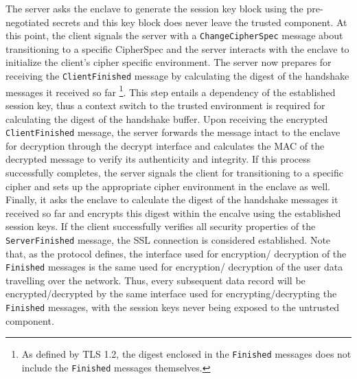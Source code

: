 \documentclass[../../main.tex]{subfiles}
\begin{document}
The server asks the enclave to generate the session key block using
the pre-negotiated secrets and this key block does never leave the
trusted component. At this point, the client signals the server with a
\texttt{ChangeCipherSpec} message about transitioning to a specific
CipherSpec and the server interacts with the enclave to initialize the
client's cipher specific environment. The server now prepares for
receiving the \texttt{ClientFinished} message by calculating the
digest of the handshake messages it received so far \footnote{As
  defined by TLS 1.2, the digest enclosed in the \texttt{Finished}
  messages does not include the \texttt{Finished} messages
  themselves.}. This step entails a dependency of the established
session key, thus a context switch to the trusted environment is
required for calculating the digest of the handshake buffer. Upon
receiving the encrypted \texttt{ClientFinished} message, the server
forwards the message intact to the enclave for decryption through the
decrypt interface and calculates the MAC of the decrypted message to
verify its authenticity and integrity. If this process successfully
completes, the server signals the client for transitioning to a
specific cipher and sets up the appropriate cipher environment in the
enclave as well. Finally, it asks the enclave to calculate the digest
of the handshake messages it received so far and encrypts this digest
within the encalve using the established session keys. If the client
successfully verifies all security properties of the
\texttt{ServerFinished} message, the SSL connection is considered
established. Note that, as the protocol defines, the interface used
for encryption/ decryption of the \texttt{Finished} messages is the
same used for encryption/ decryption of the user data travelling over
the network. Thus, every subsequent data record will be
encrypted/decrypted by the same interface used for
encrypting/decrypting the \texttt{Finished} messages, with the session
keys never being exposed to the untrusted component.
\end{document}
